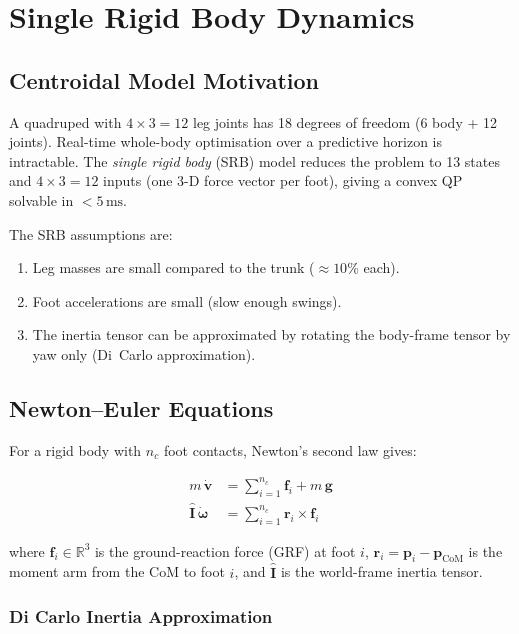 \documentclass[12pt,a4paper]{report}
\newcommand{\vect}[1]{\bm{#1}}
\newcommand{\mat}[1]{\mathbf{#1}}
\newcommand{\R}{\mathbb{R}}
\begin{document}
\chapter{Single Rigid Body Dynamics}

\section{Centroidal Model Motivation}

A quadruped with $4 \times 3 = 12$ leg joints has 18 degrees of freedom
(6 body + 12 joints).  Real-time whole-body optimisation over a predictive
horizon is intractable.  The \emph{single rigid body} (SRB) model reduces the
problem to 13 states and $4\times 3 = 12$ inputs (one 3-D force vector per
foot), giving a convex QP solvable in $<5\,\mathrm{ms}$.

The SRB assumptions are:
\begin{enumerate}[noitemsep]
  \item Leg masses are small compared to the trunk ($\approx 10\%$ each).
  \item Foot accelerations are small (slow enough swings).
  \item The inertia tensor can be approximated by rotating the body-frame
        tensor by yaw only (Di~Carlo approximation).
\end{enumerate}

\section{Newton--Euler Equations}

For a rigid body with $n_c$ foot contacts, Newton's second law gives:

\begin{align}
    m\,\dot{\vect{v}} &= \sum_{i=1}^{n_c} \vect{f}_i + m\,\vect{g}
    \label{eq:newton} \\[4pt]
    \hat{\mat{I}}\,\dot{\vect{\omega}} &=
        \sum_{i=1}^{n_c} \vect{r}_i \times \vect{f}_i
    \label{eq:euler}
\end{align}

where $\vect{f}_i \in \R^3$ is the ground-reaction force (GRF) at foot $i$,
$\vect{r}_i = \vect{p}_i - \vect{p}_\mathrm{CoM}$ is the moment arm from the
CoM to foot $i$, and $\hat{\mat{I}}$ is the world-frame inertia tensor.

\subsection{Di Carlo Inertia Approximation}
\end{document}
